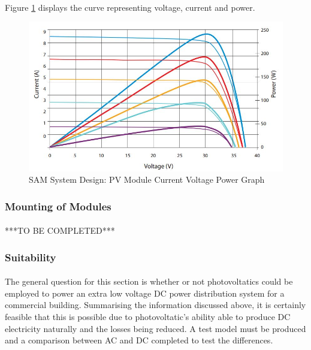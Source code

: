 \paragraph{}
Figure \ref{fig:PV-Module-Spec-Graph} displays the curve representing voltage, current and power.

\begin{figure}[H]
	\hfill\includegraphics[width = 120mm]{images/sam/pv-module-current-voltage-graph}\hspace*{\fill}
	\caption{SAM System Design: PV Module Current Voltage Power Graph \cite{website:SuntechModule}} 
	\label{fig:PV-Module-Spec-Graph}
\end{figure}


\subsubsection{Mounting of Modules}

\paragraph{}
***TO BE COMPLETED***



\subsubsection{Suitability}

\paragraph{}
The general question for this section is whether or not photovoltatics could be employed to power an extra low voltage DC power distribution system for a commercial building. Summarising the information discussed above, it is certainly feasible that this is possible due to photovoltatic's ability able to produce DC electricity naturally and the losses being reduced. A test model must be produced and a comparison between AC and DC completed to test the differences.  
